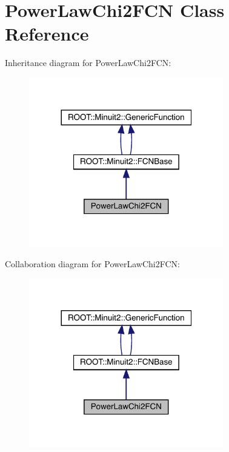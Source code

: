 \hypertarget{classPowerLawChi2FCN}{}\section{Power\+Law\+Chi2\+F\+CN Class Reference}
\label{classPowerLawChi2FCN}


Inheritance diagram for Power\+Law\+Chi2\+F\+CN\+:\nopagebreak
\begin{figure}[H]
\begin{center}
\leavevmode
\includegraphics[width=240pt]{d8/d55/classPowerLawChi2FCN__inherit__graph}
\end{center}
\end{figure}


Collaboration diagram for Power\+Law\+Chi2\+F\+CN\+:\nopagebreak
\begin{figure}[H]
\begin{center}
\leavevmode
\includegraphics[width=240pt]{d1/d7d/classPowerLawChi2FCN__coll__graph}
\end{center}
\end{figure}
